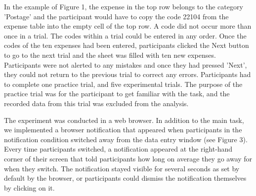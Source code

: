 In the example of Figure 1, the expense in the top row belongs to the category 'Postage' and the participant would have to copy the code 22104 from the expense table into the empty cell of the top row. A code did not occur more than once in a trial. The codes within a trial could be entered in any order. 
Once the codes of the ten expenses had been entered, participants clicked the Next button to go to the next trial and the sheet was filled with ten new expenses. Participants were not alerted to any mistakes and once they had pressed 'Next', they could not return to the previous trial to correct any errors. Participants had to complete one practice trial, and five experimental trials. The purpose of the practice trial was for the participant to get familiar with the task, and the recorded data from this trial was excluded from the analysis.

The experiment was conducted in a web browser. In addition to the main task, we implemented a browser notification that appeared when participants in the notification condition switched away from the data entry window (see Figure 3). Every time participants switched, a notification appeared at the right-hand corner of their screen that told participants how long on average they go away for when they switch. The notification stayed visible for several seconds as set by default by the browser, or participants could dismiss the notification themselves by clicking on it.

